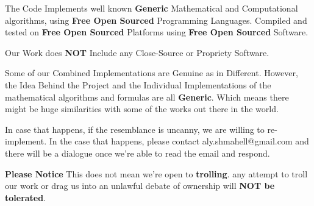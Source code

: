 \documentclass{slides}
\begin{document}
 \begin{center}
   \begin{normalsize}
  The Code Implements well known \textbf{Generic} Mathematical and Computational algorithms, using \textbf{Free Open Sourced} Programming Languages. Compiled and tested on \textbf{Free Open Sourced} Platforms using \textbf{Free Open Sourced} Software.
    \end{normalsize}
     \end{center} 
     \begin{center}
        \begin{normalsize}
  Our Work does \textbf{NOT} Include any Close-Source or Propriety Software.
  \end{normalsize}
     \end{center} 
     \begin{center}
             \begin{normalsize}
             
  \newpage
  Some of our Combined Implementations are Genuine as in Different. However, the Idea Behind the Project and the Individual Implementations of the mathematical algorithms and formulas are all \textbf{Generic}. Which means there might be huge similarities with some of the works out there in the world.
    \end{normalsize}
     \end{center} 
     \begin{center}
    \begin{normalsize}

  In case that happens, if the resemblance is uncanny, we are willing to re-implement.
  In the case that happens, please contact aly.shmahell@gmail.com and there will be a dialogue once we're able to read the email and respond.
  \end{normalsize}
     \end{center} 
     \begin{center}
         \begin{normalsize}
  \textbf{Please Notice} This does not mean we're open to \textbf{trolling}. any attempt to troll our work or drag us into an unlawful debate of ownership will \textbf{NOT be tolerated}.
  
  \end{normalsize}
   \end{center} 
\end{document}
